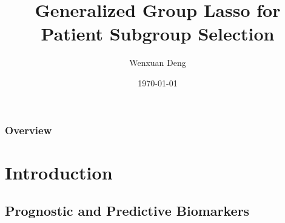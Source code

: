 \documentclass{beamer}
\title[Patient Subgroup Selection]{Generalized Group Lasso for Patient Subgroup Selection} %
\author{Wenxuan Deng} %
\institute[Takeda] %
{
Takeda Pharmaceuticals U.S.A., Inc. \\ %
\medskip
\textit{Wenxuan.Deng@takeda.com} %
}
\date{\today} %
\begin{document}
\begin{frame}
\titlepage %
\end{frame}

\begin{frame}
\frametitle{Overview} %
\tableofcontents %
\end{frame}


\section{Introduction} %

\subsection{Prognostic and Predictive Biomarkers} %
\end{document}
